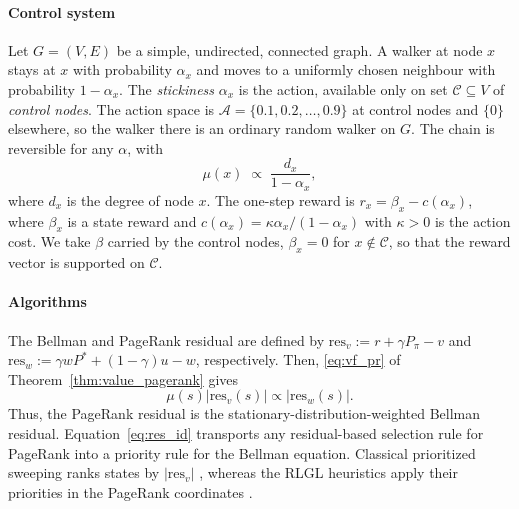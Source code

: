 \documentclass[letterpaper, 10 pt, conference]{ieeeconf}
\begin{document}
\paragraph{Control system}
Let $G=(V,E)$ be a simple, undirected, connected graph. A walker at node $x$
stays at $x$ with probability $\alpha_x$ and moves to a uniformly chosen
neighbour with probability $1-\alpha_x$. The \emph{stickiness} $\alpha_x$ is the
action, available only on set $\mathcal C\subseteq V$ of
\emph{control nodes}. The action space is $\mathscr{A}=\{0.1,0.2,\ldots,0.9\}$ at control nodes and $\{0\}$ elsewhere, so the walker
there is an ordinary random walker on $G$. The chain is reversible for any
$\alpha$, with
\begin{equation}
\label{eq:sticky_mu}
\mu(x)\;\propto\;\frac{d_x}{1-\alpha_x} ,
\end{equation}  
where $d_x$ is the degree of node $x$. The one-step reward is $r_x = \beta_x - c(\alpha_x)$,
where $\beta_x$ is a state reward and $c(\alpha_x)=\kappa \alpha_x/(1-\alpha_x)$ with $\kappa > 0$ is the action cost. We take $\beta$ carried by the
control nodes, $\beta_x=0$ for $x\notin\mathcal C$, so that the reward vector is supported on $\mathcal{C}$. 


\paragraph{Algorithms}
The Bellman and PageRank residual are defined by $\text{res}_v := r + \gamma P_\pi - v$ and $\text{res}_w := \gamma w P^* + (1-\gamma)u - w$, respectively.
Then, \eqref{eq:vf_pr} of Theorem~\ref{thm:value_pagerank} gives
\begin{equation}
    \mu(s)|\text{res}_v(s)| \propto |\text{res}_w(s)|.
    \label{eq:res_id}
\end{equation}
Thus, the PageRank residual is the stationary-distribution-weighted Bellman
residual. Equation~\eqref{eq:res_id} transports any residual-based selection
rule for PageRank into a priority rule for the Bellman equation. Classical
prioritized sweeping ranks states by $|\text{res}_v|$
\cite{moore1993prioritized,andre1997generalized}, whereas the RLGL heuristics
apply their priorities in the PageRank coordinates
\cite{RLGL,RLGL_VAR}.
\end{document}
